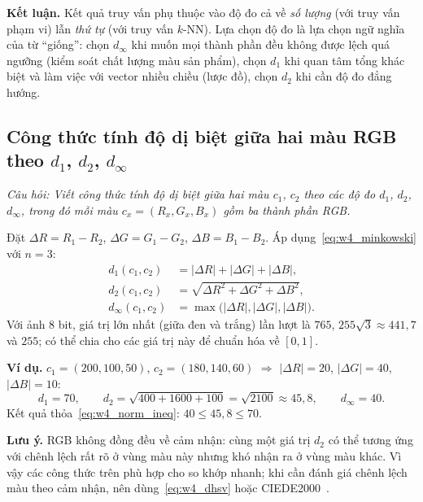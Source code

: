\textbf{Kết luận.} Kết quả truy vấn phụ thuộc vào độ đo cả về \emph{số lượng} (với truy vấn phạm vi) lẫn \emph{thứ tự} (với truy vấn $k$-NN). Lựa chọn độ đo là lựa chọn ngữ nghĩa của từ ``giống'': chọn $d_\infty$ khi muốn mọi thành phần đều không được lệch quá ngưỡng (kiểm soát chất lượng màu sản phẩm), chọn $d_1$ khi quan tâm tổng khác biệt và làm việc với vector nhiều chiều (lược đồ), chọn $d_2$ khi cần độ đo đẳng hướng.

\subsection{Công thức tính độ dị biệt giữa hai màu RGB theo $d_1$, $d_2$, $d_\infty$}
\label{subsec:w4_rgb_dist}

\textit{Câu hỏi: Viết công thức tính độ dị biệt giữa hai màu $c_1$, $c_2$ theo các độ đo $d_1$, $d_2$, $d_\infty$, trong đó mỗi màu $c_x = (R_x, G_x, B_x)$ gồm ba thành phần RGB.}

Đặt $\Delta R = R_1 - R_2$, $\Delta G = G_1 - G_2$, $\Delta B = B_1 - B_2$. Áp dụng~\eqref{eq:w4_minkowski} với $n = 3$:
\begin{align}
d_1(c_1, c_2) &= |\Delta R| + |\Delta G| + |\Delta B|, \\
d_2(c_1, c_2) &= \sqrt{\Delta R^2 + \Delta G^2 + \Delta B^2}, \\
d_\infty(c_1, c_2) &= \max\big(|\Delta R|, |\Delta G|, |\Delta B|\big).
\end{align}
Với ảnh 8 bit, giá trị lớn nhất (giữa đen và trắng) lần lượt là $765$, $255\sqrt{3} \approx 441{,}7$ và $255$; có thể chia cho các giá trị này để chuẩn hóa về $[0, 1]$.

\textbf{Ví dụ.} $c_1 = (200, 100, 50)$, $c_2 = (180, 140, 60)$ $\Rightarrow$ $|\Delta R| = 20$, $|\Delta G| = 40$, $|\Delta B| = 10$:
\begin{equation*}
d_1 = 70, \qquad d_2 = \sqrt{400 + 1600 + 100} = \sqrt{2100} \approx 45{,}8, \qquad d_\infty = 40.
\end{equation*}
Kết quả thỏa~\eqref{eq:w4_norm_ineq}: $40 \le 45{,}8 \le 70$.

\textbf{Lưu ý.} RGB không đồng đều về cảm nhận: cùng một giá trị $d_2$ có thể tương ứng với chênh lệch rất rõ ở vùng màu này nhưng khó nhận ra ở vùng màu khác. Vì vậy các công thức trên phù hợp cho so khớp nhanh; khi cần đánh giá chênh lệch màu theo cảm nhận, nên dùng~\eqref{eq:w4_dhsv} hoặc CIEDE2000~\citep{sharma2005ciede2000}.

